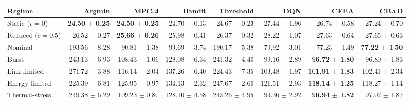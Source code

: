 \begin{tabular}{lrrrrrrr}
\toprule
Regime & Argmin & MPC-4 & Bandit & Threshold & DQN & CFBA & CBAD \\
\midrule
Static ($c=0$) & \textbf{24.50 $\pm$ 0.25} & \textbf{24.50 $\pm$ 0.25} & 24.70 $\pm$ 0.13 & 24.67 $\pm$ 0.23 & 27.44 $\pm$ 1.96 & 26.74 $\pm$ 0.58 & 27.24 $\pm$ 0.70 \\
Reduced ($c=0.5$) & 26.52 $\pm$ 0.27 & \textbf{25.66 $\pm$ 0.26} & 25.98 $\pm$ 0.41 & 26.37 $\pm$ 0.32 & 28.22 $\pm$ 1.07 & 27.63 $\pm$ 0.64 & 27.65 $\pm$ 0.63 \\
Nominal & 193.56 $\pm$ 8.28 & 90.81 $\pm$ 1.38 & 99.69 $\pm$ 3.74 & 190.17 $\pm$ 5.38 & 79.92 $\pm$ 3.01 & 77.23 $\pm$ 1.49 & \textbf{77.22 $\pm$ 1.50} \\
Burst & 243.13 $\pm$ 6.93 & 108.43 $\pm$ 1.06 & 128.08 $\pm$ 6.34 & 241.32 $\pm$ 4.40 & 99.16 $\pm$ 2.89 & \textbf{96.72 $\pm$ 1.80} & 96.80 $\pm$ 1.83 \\
Link-limited & 271.72 $\pm$ 3.88 & 116.14 $\pm$ 2.04 & 137.26 $\pm$ 6.40 & 224.43 $\pm$ 7.35 & 103.48 $\pm$ 1.97 & \textbf{101.91 $\pm$ 1.83} & 102.41 $\pm$ 2.34 \\
Energy-limited & 225.39 $\pm$ 6.81 & 125.95 $\pm$ 0.97 & 134.13 $\pm$ 2.32 & 247.67 $\pm$ 2.60 & 121.51 $\pm$ 2.93 & \textbf{118.14 $\pm$ 1.25} & 118.27 $\pm$ 1.14 \\
Thermal-stress & 249.38 $\pm$ 6.29 & 109.23 $\pm$ 0.80 & 128.10 $\pm$ 4.58 & 243.26 $\pm$ 4.95 & 99.36 $\pm$ 2.92 & \textbf{96.94 $\pm$ 1.82} & 97.02 $\pm$ 1.87 \\
\bottomrule
\end{tabular}